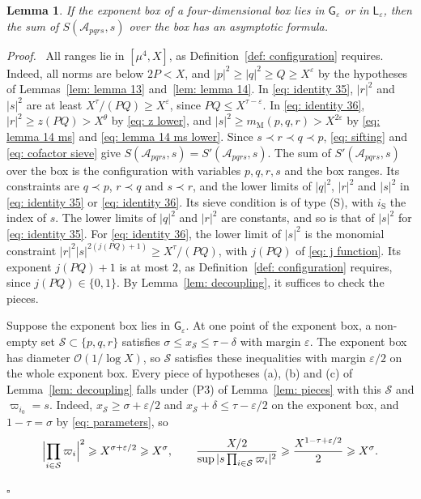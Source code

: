 \documentclass{article}
\numberwithin{equation}{section}
\newtheorem{lemma}{Lemma}
\newenvironment{proof}[1][Proof]{\par\medskip\noindent\textit{#1.}\ }{\hfill$\square$\par\medskip}
\newcommand{\Le}{\leqslant}
\newcommand{\Ge}{\geqslant}
\begin{document}
\begin{lemma}
\label{lem: four dim}
If the exponent box of a four-dimensional box lies in $\mathsf{G}_\varepsilon$ or in $\mathsf{L}_\varepsilon$, then the sum of $S(\mathcal{A}_{pqrs}, s)$ over the box has an asymptotic formula.
\end{lemma}

\begin{proof}
All ranges lie in $[\mu^4, X]$, as Definition~\ref{def: configuration} requires. Indeed, all norms are below $2P < X$, and $|p|^2 \Ge |q|^2 \Ge Q \Ge X^{\varepsilon}$ by the hypotheses of Lemmas~\ref{lem: lemma 13} and~\ref{lem: lemma 14}. In \eqref{eq: identity 35}, $|r|^2$ and $|s|^2$ are at least $X^{\tau}/(PQ) \Ge X^{\varepsilon}$, since $PQ \Le X^{\tau - \varepsilon}$. In \eqref{eq: identity 36}, $|r|^2 \Ge z(PQ) > X^{\theta}$ by \eqref{eq: z lower}, and $|s|^2 \Ge m_{\mathrm{M}}(p, q, r) > X^{2\varepsilon}$ by \eqref{eq: lemma 14 ms} and \eqref{eq: lemma 14 ms lower}. Since $s \prec r \prec q \prec p$, \eqref{eq: sifting} and \eqref{eq: cofactor sieve} give $S(\mathcal{A}_{pqrs}, s) = S'(\mathcal{A}_{pqrs}, s)$. The sum of $S'(\mathcal{A}_{pqrs}, s)$ over the box is the configuration with variables $p, q, r, s$ and the box ranges. Its constraints are $q \prec p$, $r \prec q$ and $s \prec r$, and the lower limits of $|q|^2$, $|r|^2$ and $|s|^2$ in \eqref{eq: identity 35} or \eqref{eq: identity 36}. Its sieve condition is of type (S), with $i_{\mathrm{S}}$ the index of $s$. The lower limits of $|q|^2$ and $|r|^2$ are constants, and so is that of $|s|^2$ for \eqref{eq: identity 35}. For \eqref{eq: identity 36}, the lower limit of $|s|^2$ is the monomial constraint $|r|^2|s|^{2(j(PQ)+1)} \Ge X^{\tau}/(PQ)$, with $j(PQ)$ of \eqref{eq: j function}. Its exponent $j(PQ) + 1$ is at most $2$, as Definition~\ref{def: configuration} requires, since $j(PQ) \in \{0, 1\}$. By Lemma~\ref{lem: decoupling}, it suffices to check the pieces.

Suppose the exponent box lies in $\mathsf{G}_\varepsilon$. At one point of the exponent box, a non-empty set $\mathcal{S} \subset \{p, q, r\}$ satisfies $\sigma \Le x_{\mathcal{S}} \Le \tau - \delta$ with margin $\varepsilon$. The exponent box has diameter $\mathcal{O}(1/\log X)$, so $\mathcal{S}$ satisfies these inequalities with margin $\varepsilon/2$ on the whole exponent box. Every piece of hypotheses (a), (b) and (c) of Lemma~\ref{lem: decoupling} falls under (P3) of Lemma~\ref{lem: pieces} with this $\mathcal{S}$ and $\varpi_{i_0} = s$. Indeed, $x_{\mathcal{S}} \Ge \sigma + \varepsilon/2$ and $x_{\mathcal{S}} + \delta \Le \tau - \varepsilon/2$ on the exponent box, and $1 - \tau = \sigma$ by \eqref{eq: parameters}, so
\begin{equation*}
\Bigl| \prod_{i \in \mathcal{S}} \varpi_i \Bigr|^2 \Ge X^{\sigma + \varepsilon/2} \Ge X^{\sigma}, \qquad \frac{X/2}{\sup|s \prod_{i \in \mathcal{S}} \varpi_i|^2} \Ge \frac{X^{1 - \tau + \varepsilon/2}}{2} \Ge X^{\sigma}.
\end{equation*}


\end{proof}
\end{document}
